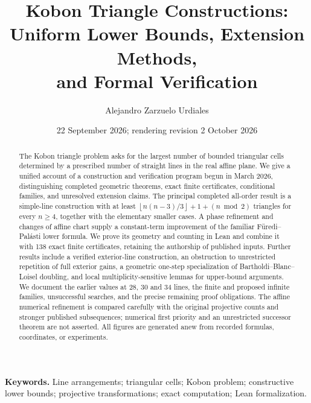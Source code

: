 \documentclass[11pt,a4paper]{article}
\title{Kobon Triangle Constructions:\\Uniform Lower Bounds, Extension Methods,\\and Formal Verification}
\author{Alejandro Zarzuelo Urdiales}
\date{22 September 2026; rendering revision 2 October 2026}
\theoremstyle{definition}
\theoremstyle{remark}
\newcommand{\floor}[1]{\left\lfloor#1\right\rfloor}
\begin{document}
\maketitle
\begin{abstract}
The Kobon triangle problem asks for the largest number of bounded triangular cells determined by a prescribed number of straight lines in the real affine plane. We give a unified account of a construction and verification program begun in March 2026, distinguishing completed geometric theorems, exact finite certificates, conditional families, and unresolved extension claims. The principal completed all-order result is a simple-line construction with at least $\floor{n(n-3)/3}+1+(n\bmod2)$ triangles for every $n\ge4$, together with the elementary smaller cases. A phase refinement and changes of affine chart supply a constant-term improvement of the familiar F\"uredi--Pal\'asti lower formula. We prove its geometry and counting in Lean and combine it with 138 exact finite certificates, retaining the authorship of published inputs. Further results include a verified exterior-line construction, an obstruction to unrestricted repetition of full exterior gains, a geometric one-step specialization of Bartholdi--Blanc--Loisel doubling, and local multiplicity-sensitive lemmas for upper-bound arguments. We document the earlier values at 28, 30 and 34 lines, the finite and proposed infinite families, unsuccessful searches, and the precise remaining proof obligations. The affine numerical refinement is compared carefully with the original projective counts and stronger published subsequences; numerical first priority and an unrestricted successor theorem are not asserted. All figures are generated anew from recorded formulas, coordinates, or experiments.
\end{abstract}
\vspace{0.4em}
\noindent\textbf{Keywords.} Line arrangements; triangular cells; Kobon problem; constructive lower bounds; projective transformations; exact computation; Lean formalization.
\clearpage
\tableofcontents
\clearpage













\clearpage
\appendix

\end{document}
